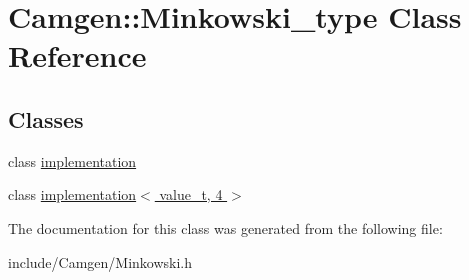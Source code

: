 \hypertarget{a00371}{}\section{Camgen\+:\+:Minkowski\+\_\+type Class Reference}
\label{a00371}
\subsection*{Classes}
\begin{DoxyCompactItemize}
\item 
class \hyperlink{a00296}{implementation}
\item 
class \hyperlink{a00300}{implementation$<$ value\+\_\+t, 4 $>$}
\end{DoxyCompactItemize}


The documentation for this class was generated from the following file\+:\begin{DoxyCompactItemize}
\item 
include/\+Camgen/Minkowski.\+h\end{DoxyCompactItemize}
